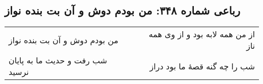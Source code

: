 \begin{center}
\section*{رباعی شماره ۳۴۸: من بودم دوش و آن بت بنده نواز}
\label{sec:sh348}
\begin{longtable}{l p{0.5cm} r}
من بودم دوش و آن بت بنده نواز
&&
از من همه لابه بود و از وی همه ناز
\\
شب رفت و حدیث ما به پایان نرسید
&&
شب را چه گنه قصهٔ ما بود دراز
\\
\end{longtable}
\end{center}
